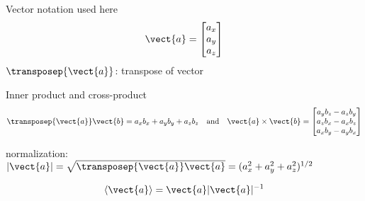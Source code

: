 \documentclass[smaller, aspectratio=169]{beamer}
\begin{document}
\begin{agaframe}{Vector notation used here}
  \centering
  \begin{equation}
    \vect{a} = \begin{bmatrix}
      a_x \\ a_y \\ a_z\\
    \end{bmatrix}
    \label{eq:defvect}
  \end{equation}
  $\transposep{\vect{a}}$: transpose of vector 
  
  \medskip
  Inner product and cross-product
  \begin{equation}
    \transposep{\vect{a}}\vect{b} = a_xb_x+a_yb_y+a_zb_z
    \quad\text{and}\quad
    \vect{a}\times\vect{b} = \begin{bmatrix}
      a_yb_z-a_zb_y \\
      a_zb_x-a_xb_z \\
      a_xb_y-a_yb_x \\
    \end{bmatrix}
    \label{eq:defdotcross}
  \end{equation}

  \medskip
  normalization: $|\vect{a}| = \sqrt{\transposep{\vect{a}}\vect{a}} = (a_x^2+a_y^2+a_z^2)^{1/2}$

  \begin{equation}
    \langle\vect{a}\rangle = \vect{a}|\vect{a}|^{-1}
  \end{equation}
\end{agaframe}
%
%
\end{document}
